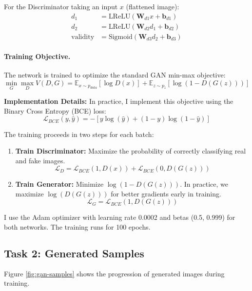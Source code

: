 \documentclass[11pt,a4paper]{article}
\begin{document}
For the Discriminator taking an input $x$ (flattened image):
\begin{align*}
d_1 &= \text{LReLU}(\mathbf{W}_{d1}x + \mathbf{b}_{d1}) \\
d_2 &= \text{LReLU}(\mathbf{W}_{d2}d_1 + \mathbf{b}_{d2}) \\
\text{validity} &= \text{Sigmoid}(\mathbf{W}_{d3}d_2 + \mathbf{b}_{d3})
\end{align*}

\paragraph{Training Objective.} The network is trained to optimize the standard GAN min-max objective:
\[ \min_G \max_D V(D, G) = \mathbb{E}_{x \sim p_{data}}[\log D(x)] + \mathbb{E}_{z \sim p_{z}}[\log (1 - D(G(z)))] \]

\textbf{Implementation Details:}
In practice, I implement this objective using the Binary Cross Entropy (BCE) loss:
\[ \mathcal{L}_{BCE}(y, \hat{y}) = - [y \log(\hat{y}) + (1-y) \log(1-\hat{y})] \]

The training proceeds in two steps for each batch:
\begin{enumerate}
    \item \textbf{Train Discriminator:} Maximize the probability of correctly classifying real and fake images.
    \[ \mathcal{L}_D = \mathcal{L}_{BCE}(1, D(x)) + \mathcal{L}_{BCE}(0, D(G(z))) \]
    \item \textbf{Train Generator:} Minimize $\log(1 - D(G(z)))$. In practice, we maximize $\log(D(G(z)))$ for better gradients early in training.
    \[ \mathcal{L}_G = \mathcal{L}_{BCE}(1, D(G(z))) \]
\end{enumerate}

I use the Adam optimizer with learning rate 0.0002 and betas (0.5, 0.999) for both networks. The training runs for 100 epochs.

\subsection{Task 2: Generated Samples}
Figure \ref{fig:gan-samples} shows the progression of generated images during training. 
\end{document}
